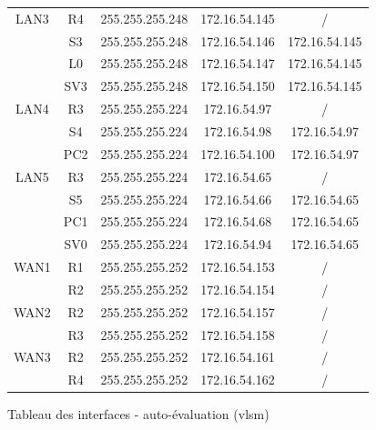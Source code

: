 \documentclass[a4paper]{article}
\begin{document}
\begin{itemize}
\begin{figure}[H]
\begin{tabular}{|c|c| c |c|c|}
        \multirow{4}{*}{LAN3}
        & R4  & 255.255.255.248 & 172.16.54.145 & / \\
        & S3  & 255.255.255.248 & 172.16.54.146 & 172.16.54.145 \\
        & L0  & 255.255.255.248 & 172.16.54.147 & 172.16.54.145 \\
        & SV3 & 255.255.255.248 & 172.16.54.150 & 172.16.54.145 \\ \hline

        \multirow{3}{*}{LAN4}
        & R3  & 255.255.255.224 & 172.16.54.97 & / \\
        & S4  & 255.255.255.224 & 172.16.54.98 & 172.16.54.97 \\
        & PC2 & 255.255.255.224 & 172.16.54.100 & 172.16.54.97 \\ \hline

        \multirow{4}{*}{LAN5}
        & R3  & 255.255.255.224 & 172.16.54.65 & / \\
        & S5  & 255.255.255.224 & 172.16.54.66 & 172.16.54.65 \\
        & PC1 & 255.255.255.224 & 172.16.54.68 & 172.16.54.65 \\
        & SV0 & 255.255.255.224 & 172.16.54.94 & 172.16.54.65 \\ \hline

        \multirow{2}{*}{WAN1}
        & R1 & 255.255.255.252 & 172.16.54.153 & / \\
        & R2 & 255.255.255.252 & 172.16.54.154 & / \\ \hline

        \multirow{2}{*}{WAN2}
        & R2 & 255.255.255.252 & 172.16.54.157 & / \\
        & R3 & 255.255.255.252 & 172.16.54.158 & / \\ \hline

        \multirow{2}{*}{WAN3}
        & R2 & 255.255.255.252 & 172.16.54.161 & / \\
        & R4 & 255.255.255.252 & 172.16.54.162 & / \\ \hline
    \end{tabular}
    \caption{Tableau des interfaces - auto-évaluation (vlsm)}
    \label{}
\end{figure}





\end{itemize}
\end{document}
